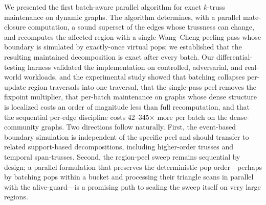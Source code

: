 \label{sec:conclusion}

We presented the first batch-aware parallel algorithm for exact $k$-truss maintenance on dynamic graphs.
The algorithm determines, with a parallel mate-closure computation, a sound superset of the edges whose trussness can change, and recomputes the affected region with a single Wang--Cheng peeling pass whose boundary is simulated by exactly-once virtual pops; we established that the resulting maintained decomposition is exact after every batch.
Our differential-testing harness validated the implementation on controlled, adversarial, and real-world workloads, and the experimental study showed that batching collapses per-update region traversals into one traversal, that the single-pass peel removes the fixpoint multiplier, that per-batch maintenance on graphs whose dense structure is localized costs an order of magnitude less than full recomputation, and that the sequential per-edge discipline costs 42--345$\times$ more per batch on the dense-community graphs.
Two directions follow naturally.
First, the event-based boundary simulation is independent of the specific peel and should transfer to related support-based decompositions, including higher-order trusses and temporal span-trusses.
Second, the region-peel sweep remains sequential by design; a parallel formulation that preserves the deterministic pop order---perhaps by batching pops within a bucket and processing their triangle scans in parallel with the alive-guard---is a promising path to scaling the sweep itself on very large regions.
